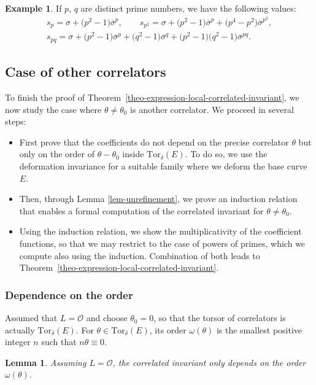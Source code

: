 \documentclass[11pt]{article}
\numberwithin{equation}{section}
\newcommand{\Tor}{\mathrm{Tor}}
\newcommand{\pt}{\mathrm{pt}}
\newcommand{\bfw}{ {\boldsymbol w} }
\renewcommand{\O}{\mathcal{O}}
\numberwithin{equation}{section}
\newtheorem{lem}[theo]{Lemma}
\theoremstyle{definition}
\newtheorem{expl}[theo]{Example}
\begin{document}
\begin{expl}
If $p$, $q$ are distinct prime numbers, we have the following values:
 \begin{gather*}
s_p = \sigma+\bigl(p^2-1\bigr)\overline{\sigma}^p,\qquad
s_{p^2}= \sigma+\bigl(p^2-1\bigr)\overline{\sigma}^p+\bigl(p^4-p^2\bigr)\overline{\sigma}^{p^2},\\
s_{pq} = \sigma + \bigl(p^2-1\bigr)\overline{\sigma}^p + \bigl(q^2-1\bigr)\overline{\sigma}^q+\bigl(p^2-1\bigr)\bigl(q^2-1\bigr)\overline{\sigma}^{pq}.
\end{gather*}
\end{expl}


\subsection{Case of other correlators}

To finish the proof of Theorem~\ref{theo-expression-local-correlated-invariant}, we now study the case where $\theta\neq\theta_0$ is another correlator. We proceed in several steps:
 \begin{itemize}\itemsep=0pt %
 \item First prove that the coefficients do not depend on the precise correlator $\theta$ but only on the order of $\theta-\theta_0$ inside $\Tor_\delta(E)$. To do so, we use the deformation invariance for a suitable family where we deform the base curve $E$.
 \item Then, through Lemma \ref{lem-unrefinement}, we prove an induction relation that enables a formal computation of the correlated invariant for $\theta\neq \theta_0$.
 \item Using the induction relation, we show the multiplicativity of the coefficient functions, so that we may restrict to the case of powers of primes, which we compute also using the induction. Combination of both leads to Theorem~\ref{theo-expression-local-correlated-invariant}.
 \end{itemize}

\subsubsection{Dependence on the order} Assumed that $L=\O$ and choose $\theta_0=0$, so that the torsor of correlators is actually $\Tor_\delta(E)$. For $\theta\in\Tor_\delta(E)$, its order $\omega(\theta)$ is the smallest positive integer $n$ such that $n\theta\equiv 0$.

\begin{lem}
 Assuming $L=\O$, the correlated invariant \smash{$\langle \pt_0,1_{w_1},\pt_{w_2},\dots,\pt_{w_n}\rangle_{1,a[E],\bfw}^\theta$} only depends on the order $\omega(\theta)$.
\end{lem}
\end{document}
